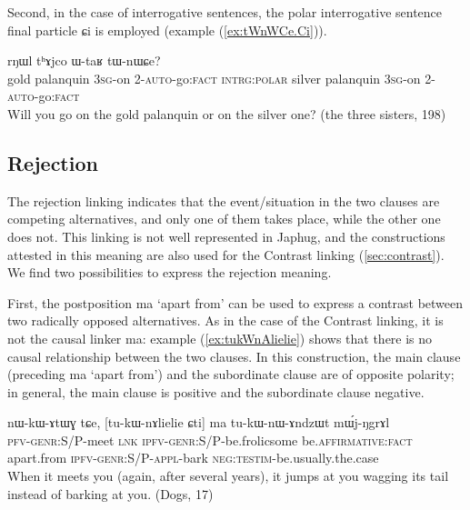 \documentclass[oldfontcommands,oneside,a4paper,11pt]{article}
\newcommand{\ipa}[1]{{\phon \mbox{#1}}} %
\newcommand{\refb}[1]{(\ref{#1})}
\begin{document}
Second, in the case of interrogative sentences, the polar interrogative sentence final particle \ipa{ɕi} is employed (example \refb{ex:tWnWCe.Ci}).

\begin{exe}
\ex \label{ex:tWnWCe.Ci}
\gll 
[\ipa{χsɤr}    	\ipa{tʰɤjco}    	\ipa{ɯ-taʁ}    	\ipa{tɯ-nɯ-ɕe}]    	\ipa{ɕi,}    	\ipa{rŋɯl}    	\ipa{tʰɤjco}    	\ipa{ɯ-taʁ}    	\ipa{tɯ-nɯɕe?}    	\\
gold palanquin \textsc{3sg}-on \textsc{2-auto}-go:\textsc{fact} \textsc{intrg:polar} silver palanquin \textsc{3sg}-on \textsc{2-auto}-go:\textsc{fact} \\
\glt Will you go on the gold palanquin or on the silver one? (the three sisters, 198)
 \end{exe}
 
\subsection{Rejection} \label{sec:rejection}

The rejection linking indicates that the event/situation in the two clauses are competing alternatives, and only one of them takes place, while the other one  does not. This linking is not well represented in Japhug, and the constructions attested in this meaning are also used for the Contrast linking \refb{sec:contrast}. We find two possibilities to express the rejection meaning.

First, the postposition \ipa{ma} `apart from'  can be used to express a contrast between two radically opposed alternatives.  As in the case of the Contrast linking, it is not the causal linker \ipa{ma}: example \refb{ex:tukWnAlielie} shows that there is no causal relationship between the two clauses. In this construction, the main clause (preceding  \ipa{ma} `apart from') and the subordinate clause are of opposite polarity; in general, the main clause is positive and the subordinate clause negative.



\begin{exe}
\ex \label{ex:tukWnAlielie}
\gll
\ipa{nɯ-kɯ-ɤtɯɣ}  	\ipa{tɕe,}  	[\ipa{tu-kɯ-nɤlielie}  	\ipa{ɕti}]  	\ipa{ma}  	\ipa{tu-kɯ-nɯ-ɤndzɯt}  	\ipa{mɯ́j-ŋgrɤl}  	\\
\textsc{pfv-genr:S/P}-meet \textsc{lnk} \textsc{ipfv-genr:S/P}-be.frolicsome be.\textsc{affirmative}:\textsc{fact}  apart.from \textsc{ipfv-genr:S/P}-\textsc{appl}-bark \textsc{neg:testim}-be.usually.the.case \\
\glt When it meets you (again, after several years), it jumps at you wagging its tail instead of barking at you.  (Dogs, 17)
\end{exe}
 
\end{document}
